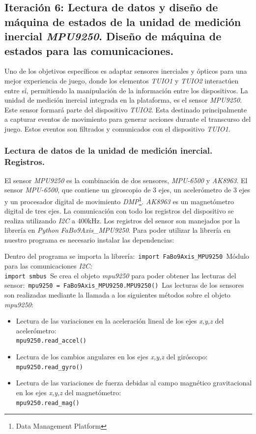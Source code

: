 \subsection{Iteración 6: Lectura de datos y diseño de máquina de estados de la unidad de medición inercial \emph{MPU9250}. Diseño de máquina de estados para las comunicaciones.}
Uno de los objetivos específicos es adaptar sensores inerciales y ópticos para una mejor experiencia de juego, donde los elementos \emph{TUIO1} y \emph{TUIO2} interactúen entre sí, permitiendo la manipulación de la información entre los dispositivos.
La unidad de medición inercial integrada en la plataforma, es el sensor \emph{MPU9250}. Este sensor formará parte del dispositivo \emph{TUIO2}. Esta destinado principalmente a capturar eventos de movimiento para generar acciones durante el transcurso del juego. Estos eventos son filtrados y comunicados con el dispositivo \emph{TUIO1}.
\subsubsection{Lectura de datos de la unidad de medición inercial. Registros.}
El sensor \emph{MPU9250} es la combinación de dos sensores, \emph{MPU-6500} y \emph{AK8963}. El sensor \emph{MPU-6500}, que contiene un giroscopio de 3 ejes, un acelerómetro de 3 ejes y un procesador digital de movimiento \emph{DMP}\footnote{Data Management Platform}. \emph{AK8963} es un magnetómetro digital de tres ejes.
La comunicación con todo los registros del dispositivo se realiza utilizando \emph{I2C} a 400kHz.
Los registros del sensor son manejados por la librería en \emph{Python} \emph{FaBo9Axis\_MPU9250}.
Para poder utilizar la librería en nuestro programa es necesario instalar las dependencias:\
Dentro del programa se importa la librería:\
\texttt{import FaBo9Axis\_MPU9250}\
Módulo para las comunicaciones \emph{I2C:}\\
\texttt{import smbus}\
Se crea el objeto \emph{mpu9250} para poder obtener las lecturas del sensor:\
\texttt{mpu9250 = FaBo9Axis\_MPU9250.MPU9250()}\
Las lecturas de los sensores son realizadas mediante la llamada a los siguientes métodos sobre el objeto \emph{mpu9250}:\
\begin{itemize}
\item Lectura de las variaciones en la aceleración lineal de los ejes \emph{x,y,z} del acelerómetro:\\ 
\texttt{mpu9250.read\_accel()}\
\item Lectura de los cambios angulares en los ejes \emph{x,y,z} del giróscopo:\\ \texttt{mpu9250.read\_gyro()}\
\item Lectura de las variaciones de fuerza debidas al campo magnético gravitacional en los ejes \emph{x,y,z} del magnetómetro:\\ 
\texttt{mpu9250.read\_mag()}\
\end{itemize}
